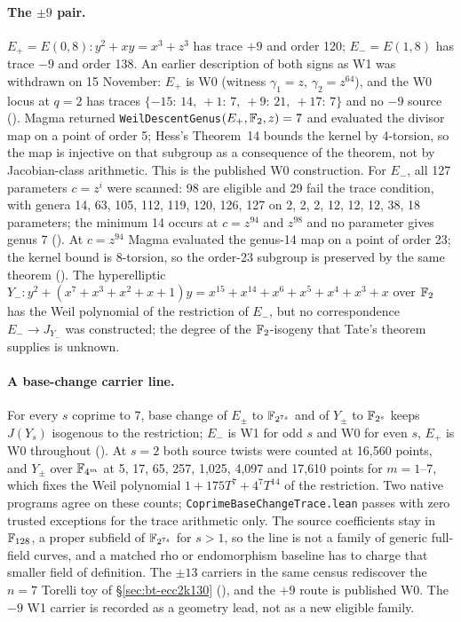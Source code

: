 \paragraph{The $\pm9$ pair.} $E_+=E(0,8)\colon y^2+xy=x^3+z^3$ has trace
$+9$ and order 120; $E_-=E(1,8)$ has trace $-9$ and order 138. An earlier
description of both signs as W1 was withdrawn on 15 November: $E_+$ is W0
(witness $\gamma_1=z$, $\gamma_2=z^{64}$), and the W0 locus at $q=2$ has
traces $\{-15{:}\,14,\ +1{:}\,7,\ +9{:}\,21,\ +17{:}\,7\}$ and no $-9$
source (). Magma
returned \texttt{WeilDescentGenus}$(E_+,\mathbb{F}_2,z)=7$ and evaluated the divisor
map on a point of order 5; Hess's Theorem~14 bounds the kernel by 4-torsion,
so the map is injective on that subgroup as a consequence of the theorem, not
by Jacobian-class arithmetic. This is the published W0 construction. For
$E_-$, all 127 parameters $c=z^i$ were scanned: 98 are eligible and 29 fail
the trace condition, with genera 14, 63, 105, 112, 119, 120, 126, 127 on 2, 2,
2, 12, 12, 12, 38, 18 parameters; the minimum 14 occurs at $c=z^{94}$ and
$z^{98}$ and no parameter gives genus 7
(). At
$c=z^{94}$ Magma evaluated the genus-14 map on a point of order 23; the
kernel bound is 8-torsion, so the order-23 subgroup is preserved by the same
theorem (). The
hyperelliptic $Y_-\colon y^2+(x^7+x^3+x^2+x+1)y=x^{15}+x^{14}+x^6+x^5+x^4+x^3+x$
over $\mathbb{F}_2$ has the Weil polynomial of the restriction of $E_-$, but no
correspondence $E_-\to J_{Y_-}$ was constructed; the degree of the
$\mathbb{F}_2$-isogeny that Tate's theorem supplies is unknown.

\paragraph{A base-change carrier line.} For every $s$ coprime to 7, base
change of $E_\pm$ to $\mathbb{F}_{2^{7s}}$ and of $Y_\pm$ to $\mathbb{F}_{2^s}$ keeps
$J(Y_s)$ isogenous to the restriction; $E_-$ is W1 for odd $s$ and W0 for
even $s$, $E_+$ is W0 throughout
(). At $s=2$ both source
twists were counted at 16{,}560 points, and $Y_\pm$ over $\mathbb{F}_{4^m}$ at
5, 17, 65, 257, 1{,}025, 4{,}097 and 17{,}610 points for $m=1$--7, which fixes the
Weil polynomial $1+175T^7+4^7T^{14}$ of the restriction. Two native programs
agree on these counts; \texttt{CoprimeBaseChangeTrace.lean} passes with zero
trusted exceptions for the trace arithmetic only. The source coefficients stay
in $\mathbb{F}_{128}$, a proper subfield of $\mathbb{F}_{2^{7s}}$ for $s>1$, so the line is
not a family of generic full-field curves, and a matched rho or endomorphism
baseline has to charge that smaller field of definition. The $\pm13$ carriers
in the same census rediscover the $n=7$ Torelli toy of \S\ref{sec:bt-ecc2k130} (),
and the $+9$ route is published W0. The $-9$ W1 carrier is recorded as a
geometry lead, not as a new eligible family.

